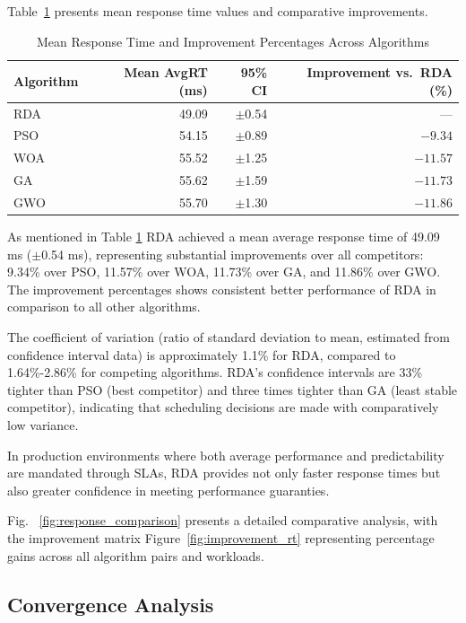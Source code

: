 \documentclass[pdflatex,sn-mathphys-num]{sn-jnl}%
\begin{document}
Table~\ref{tbl:response_time_comparison} presents mean response time values and comparative improvements.

\begin{table}[htbp]
\centering
\caption{Mean Response Time and Improvement Percentages Across Algorithms}
\label{tbl:response_time_comparison}
\begin{tabular}{l r r r}
\toprule
\textbf{Algorithm} & \textbf{Mean AvgRT (ms)} & \textbf{95\% CI} & \textbf{Improvement vs.~RDA (\%)} \\
\midrule
RDA & 49.09 & $\pm$0.54 & --- \\
PSO & 54.15 & $\pm$0.89 & $-9.34$ \\
WOA & 55.52 & $\pm$1.25 & $-11.57$ \\
GA & 55.62 & $\pm$1.59 & $-11.73$ \\
GWO & 55.70 & $\pm$1.30 & $-11.86$ \\
\bottomrule
\end{tabular}
\end{table}

As mentioned in Table \ref{tbl:response_time_comparison} RDA achieved a mean average response time of 49.09 ms ($\pm$0.54 ms), representing substantial improvements over all competitors: 9.34\% over PSO, 11.57\% over WOA, 11.73\% over GA, and 11.86\% over GWO. The improvement percentages shows consistent better performance of RDA in comparison to all other algorithms.

The coefficient of variation (ratio of standard deviation to mean, estimated from confidence interval data) is approximately 1.1\% for RDA, compared to 1.64\%-2.86\% for competing algorithms. RDA's confidence intervals are 33\% tighter than PSO (best competitor) and three times tighter than GA (least stable competitor), indicating that scheduling decisions are made with comparatively low variance.

In production environments where both average performance and predictability are mandated through SLAs, RDA provides not only faster response times but also greater confidence in meeting performance guaranties.

Fig. ~\ref{fig:response_comparison} presents a detailed comparative analysis, with the improvement matrix Figure~\ref{fig:improvement_rt} representing percentage gains across all algorithm pairs and workloads.

\subsection{Convergence Analysis}\label{subsec6.3}
\end{document}
